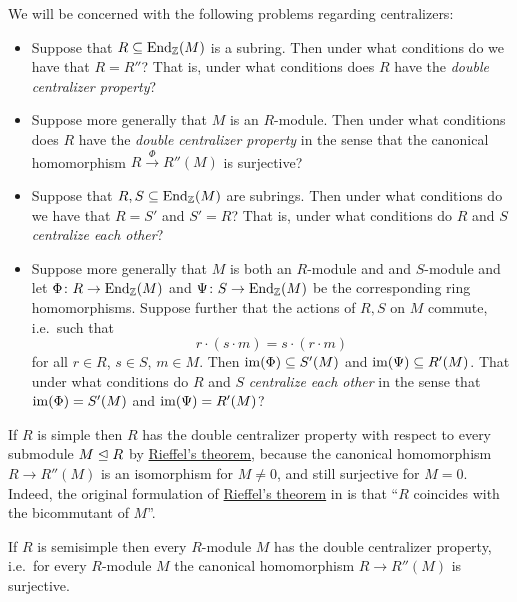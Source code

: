 \begin{fluff}
  We will be concerned with the following problems regarding centralizers:
  \begin{itemize}
    \item
      Suppose that $R \subseteq \operatorname{End}_{\mathbb{Z}}(M)$ is a subring.
      Then under what conditions do we have that $R = R''$?
      That is, under what conditions does $R$ have the \emph{double centralizer property}?
    \item
      Suppose more generally that $M$ is an $R$-module.
      Then under what conditions does $R$ have the \emph{double centralizer property} in the sense that the canonical homomorphism $R \xrightarrow{\Phi} R''(M)$ is surjective?
    \item
      Suppose that $R, S \subseteq \operatorname{End}_{\mathbb{Z}}(M)$ are subrings.
      Then under what conditions do we have that $R = S'$ and $S' = R$?
      That is, under what conditions do $R$ and $S$ \emph{centralize each other}?
    \item
      Suppose more generally that $M$ is both an $R$-module and and $S$-module and let $\Phi \colon R \to \operatorname{End}_{\mathbb{Z}}(M)$ and $\Psi \colon S \to \operatorname{End}_{\mathbb{Z}}(M)$ be the corresponding ring homomorphisms.
      Suppose further that the actions of $R, S$ on $M$ commute, i.e.\ such that
      \[
          r \cdot (s \cdot m)
        = s \cdot (r \cdot m)
      \]
      for all $r \in R$, $s \in S$, $m \in M$.
      Then $\operatorname{im}(\Phi) \subseteq S'(M)$ and $\operatorname{im}(\Psi) \subseteq R'(M)$.
      That under what conditions do $R$ and $S$ \emph{centralize each other} in the sense that $\operatorname{im}(\Phi) = S'(M)$ and $\operatorname{im}(\Psi) = R'(M)$?
  \end{itemize}
\end{fluff}


\begin{example}
  If $R$ is simple then $R$ has the double centralizer property with respect to every submodule $M \trianglelefteq R$ by \hyperref[lemma: rieffels theorem]{Rieffel’s theorem}, because the canonical homomorphism $R \to R''(M)$ is an isomorphism for $M \neq 0$, and still surjective for $M = 0$.
  Indeed, the original formulation of \hyperref[lemma: rieffels theorem]{Rieffel’s theorem} in \cite{Rieffel} is that \enquote{$R$ coincides with the bicommutant of $M$}.
\end{example}


\begin{proposition}
  \label{proposition: semisimple rings are balanced}
  If $R$ is semisimple then every $R$-module $M$ has the double centralizer property, i.e.\ for every $R$-module $M$ the canonical homomorphism $R \to R''(M)$ is surjective.
\end{proposition}


